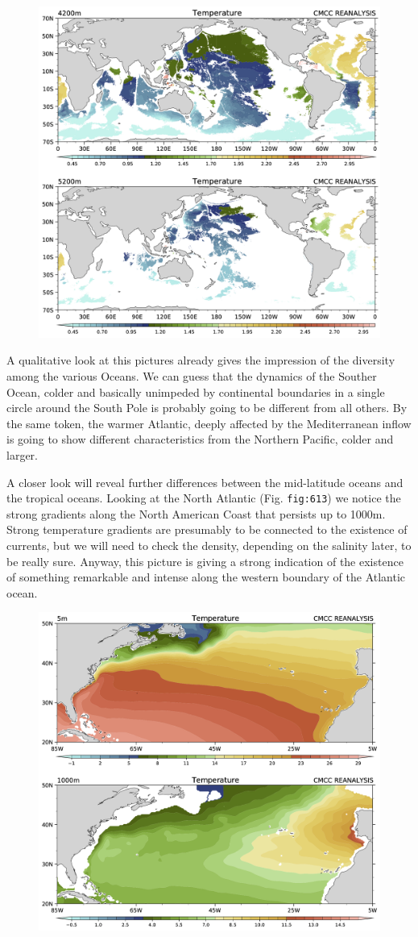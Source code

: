 \begin{figure}
\centering
\includegraphics[width = .7 \textwidth]{figs/GD/Temp4200-5200.png}
\caption{} \label{fig:}
\end{figure}

A qualitative look at this pictures already gives the impression of the
diversity among the various Oceans. We can guess that the dynamics of
the Souther Ocean, colder and basically unimpeded by continental
boundaries in a single circle around the South Pole is probably going to
be different from all others. By the same token, the warmer Atlantic,
deeply affected by the Mediterranean inflow is going to show different
characteristics from the Northern Pacific, colder and larger.

A closer look will reveal further differences between the mid-latitude
oceans and the tropical oceans. Looking at the North Atlantic (Fig.
\texttt{fig:613}) we notice the strong gradients along the North
American Coast that persists up to 1000m. Strong temperature gradients
are presumably to be connected to the existence of currents, but we will
need to check the density, depending on the salinity later, to be really
sure. Anyway, this picture is giving a strong indication of the
existence of something remarkable and intense along the western boundary
of the Atlantic ocean.

\begin{figure}
\centering
\includegraphics[width = .7 \textwidth]{figs/GD/Gulf1000.png}
\caption{} \label{fig:}
\end{figure}


